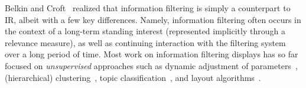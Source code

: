 


Belkin and Croft~\cite{Belkin1992} realized that information filtering is simply a counterpart to IR, albeit with a few key differences.  Namely,  
information filtering often occurs in the context of a long-term standing interest (represented implicitly through a relevance measure), as well as continuing interaction with the filtering system over a long period of time.
Most work on information filtering  displays has so far focused on \emph{unsupervised} approaches such as 
dynamic adjustment of parameters~\cite{Ahlberg1995,Bennamane2012,Young1993},
(hierarchical) clustering~\cite{Nocaj2012,Teitler2008,Smith2009}, 
topic classification~\cite{Sankaranarayanan2009,Liu2012,Liu2009}, 
and layout algorithms~\cite{Yifan2015,Jacomy2014,Sugiyama1981,Kamada1989}.

